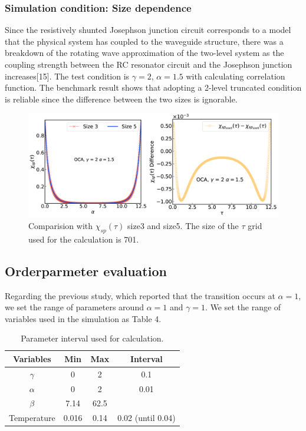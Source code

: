 \documentclass{article}
\begin{document}
\begin{spacing}{1.3}
\subsubsection*{Simulation condition: Size dependence}
Since the resistively shunted Josephson junction circuit corresponds to a model that the physical system has coupled to the waveguide structure,
there was a breakdown of the rotating wave approximation of the two-level system as the coupling strength between the RC resonator circuit 
and the Josephson junction increases[15]. The test condition is $\gamma =2$, $\alpha = 1.5$ with calculating correlation function. 
The benchmark result shows that adopting a 2-level truncated condition is reliable since the difference between the two sizes is ignorable.
\begin{figure}[H]
  \centerline{\includegraphics[width=12cm]{TexFigure/4/4_2_02_sizediff.png}}
  \caption{Comparision with $\chi_{sp}(\tau)$ size3 and size5. The size of the $\tau$ grid used for the calculation is 701.}
\end{figure}
\subsection{Orderparmeter evaluation}
Regarding the previous study, which reported that the transition occurs at $\alpha = 1$, we set the range of parameters around $\alpha = 1$ and $\gamma = 1$.
We set the range of variables used in the simulation as Table 4.
\begin{table}[htbp]
  \centering
  \renewcommand{\arraystretch}{1.2}  %
  \begin{tabular}{@{}cccc@{}}
  \toprule
  \textbf{Variables} & \textbf{Min} & \textbf{Max}  & \textbf{Interval}\\ 
  \midrule
  $\gamma$ & 0 & 2 & 0.1 \\
  $\alpha$ & 0 & 2 & 0.01 \\
  $\beta$ & 7.14 & 62.5 &  \\
  Temperature & 0.016 & 0.14 & 0.02 (until 0.04) \\
  \bottomrule
  \end{tabular}
  \caption{Parameter interval used for calculation.}
  \end{table}

\end{spacing}
\end{document}
